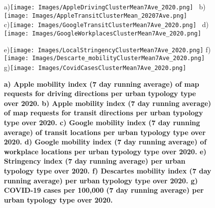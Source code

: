 \documentclass[preprint,12pt]{elsarticle}
\begin{document}
\begin{figure}
{\tiny a)}\texttt{[image: Images/AppleDrivingClusterMean7Ave\_2020.png]}~
{\tiny b)}\texttt{[image: Images/AppleTransitClusterMean\_20207Ave.png]}
\\
{\tiny c)}\texttt{[image: Images/GoogleTransitClusterMean7Ave\_2020.png]}~
{\tiny d)}\texttt{[image: Images/GoogleWorkplacesClusterMean7Ave\_2020.png]}

{\tiny e)}\texttt{[image: Images/LocalStringencyClusterMean7Ave\_2020.png]}
{\tiny f)}\texttt{[image: Images/Descarte\_mobilityClusterMean7Ave\_2020.png]}
{\tiny g)}\texttt{[image: Images/CovidCasesClusterMean7Ave\_2020.png]}

\caption{\bf a) Apple mobility index (7 day running average) of map requests for driving directions per urban typology type over 2020. b) Apple mobility index (7 day running average) of map requests for transit directions per urban typology type over 2020. c) Google mobility index (7 day running average) of transit locations per urban typology type over 2020. d) Google mobility index (7 day running average) of workplace locations per urban typology type over 2020. e) Stringency index (7 day running average) per urban typology type over 2020. f) Descartes mobility index (7 day running average) per urban typology type over 2020. g) COVID-19 cases per 100,000 (7 day running average) per urban typology type over 2020.}
 \label{fig:driving}
\end{figure}
\end{document}
